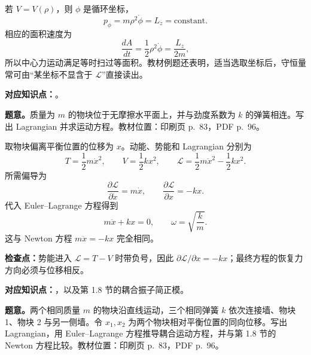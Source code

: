 \begin{checkedsolution}
若 $V=V(\rho)$，则 $\phi$ 是循环坐标，
\begin{equation}
  p_\phi=m\rho^2\dot\phi=L_z=\text{constant}.
  \label{eq:QM-C02-S01-polar-angular-momentum}
\end{equation}
相应的面积速度为
\begin{equation}
  \frac{dA}{dt}=\frac12\rho^2\dot\phi=\frac{L_z}{2m},
  \label{eq:QM-C02-S01-areal-velocity}
\end{equation}
所以中心力运动满足等时扫过等面积。教材例题还表明，适当选取坐标后，守恒量常可由“某坐标不显含于 $\mathcal L$”直接读出。

\end{checkedsolution}


\textbf{对应知识点：}。

\textbf{题意。}质量为 $m$ 的物块位于无摩擦水平面上，并与劲度系数为 $k$ 的弹簧相连。写出 Lagrangian 并求运动方程。教材位置：印刷页 p.~83，PDF p.~96。

\begin{checkedsolution}
取物块偏离平衡位置的位移为 $x$。动能、势能和 Lagrangian 分别为
\[
  T=\frac12m\dot x^2,
  \qquad
  V=\frac12kx^2,
  \qquad
  \mathcal L=\frac12m\dot x^2-\frac12kx^2.
\]
所需偏导为
\[
  \frac{\partial\mathcal L}{\partial\dot x}=m\dot x,
  \qquad
  \frac{\partial\mathcal L}{\partial x}=-kx.
\]
代入 Euler--Lagrange 方程得到
\begin{equation}
  \boxed{m\ddot x+kx=0,}
  \qquad
  \omega=\sqrt{\frac{k}{m}}.
  \label{eq:QM-C02-S01-E01-oscillator}
\end{equation}
这与 Newton 方程 $m\ddot x=-kx$ 完全相同。
\end{checkedsolution}

\textbf{检查点：}势能进入 $\mathcal L=T-V$ 时带负号，因此 $\partial\mathcal L/\partial x=-kx$；最终方程的恢复力方向必须与位移相反。


\textbf{对应知识点：}，以及第 1.8 节的耦合振子简正模。

\textbf{题意。}两个相同质量 $m$ 的物块沿直线运动，三个相同弹簧 $k$ 依次连接墙、物块 1、物块 2 与另一侧墙。令 $x_1,x_2$ 为两个物块相对平衡位置的同向位移。写出 Lagrangian，用 Euler--Lagrange 方程推导耦合运动方程，并与第 1.8 节的 Newton 方程比较。教材位置：印刷页 p.~83，PDF p.~96。


